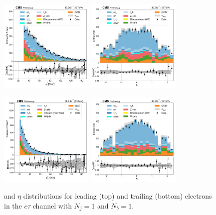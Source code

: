 \begin{figure}[htb!]
    \centering
    \includegraphics[width=0.4\textwidth]{chapters/Appendix/sectionPlots/figures/data_mc_overlays/etau_2016_cat_eq1_eq1_signal_linear_lepton_lepton1_pt}
    \includegraphics[width=0.4\textwidth]{chapters/Appendix/sectionPlots/figures/data_mc_overlays/etau_2016_cat_eq1_eq1_signal_linear_lepton_lepton1_eta}

    \includegraphics[width=0.4\textwidth]{chapters/Appendix/sectionPlots/figures/data_mc_overlays/etau_2016_cat_eq1_eq1_signal_linear_lepton_lepton2_pt}
    \includegraphics[width=0.4\textwidth]{chapters/Appendix/sectionPlots/figures/data_mc_overlays/etau_2016_cat_eq1_eq1_signal_linear_lepton_lepton2_eta}
    \caption{\pt and $\eta$ distributions for leading (top) and trailing
        (bottom) electrons in the $e\tau$ channel with $N_{j} = 1$ and
        $N_{b} = 1$.}
    \label{fig:etau_3_kinematic}
\end{figure}

